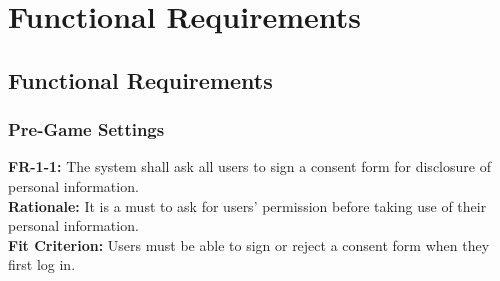 \documentclass[12pt]{article}
\begin{document}
\section{Functional Requirements}
\subsection{Functional Requirements}
\subsubsection{Pre-Game Settings}
    \textbf{FR-1-1:} The system shall ask all users to sign a consent form for disclosure of personal information.\\
    \textbf{Rationale:} It is a must to ask for users' permission before taking use of their personal information.\\
    \textbf{Fit Criterion:} Users must be able to sign or reject a consent form when they first log in.\\\\
    
\end{document}
